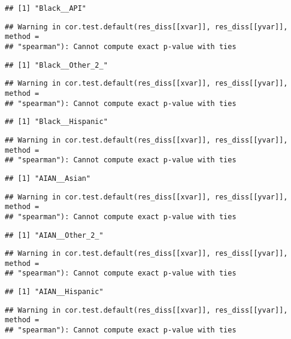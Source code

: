 \documentclass[
]{article}
\begin{document}
\begin{verbatim}
## [1] "Black__API"
\end{verbatim}

\begin{verbatim}
## Warning in cor.test.default(res_diss[[xvar]], res_diss[[yvar]], method =
## "spearman"): Cannot compute exact p-value with ties
\end{verbatim}

\begin{verbatim}
## [1] "Black__Other_2_"
\end{verbatim}

\begin{verbatim}
## Warning in cor.test.default(res_diss[[xvar]], res_diss[[yvar]], method =
## "spearman"): Cannot compute exact p-value with ties
\end{verbatim}

\begin{verbatim}
## [1] "Black__Hispanic"
\end{verbatim}

\begin{verbatim}
## Warning in cor.test.default(res_diss[[xvar]], res_diss[[yvar]], method =
## "spearman"): Cannot compute exact p-value with ties
\end{verbatim}

\begin{verbatim}
## [1] "AIAN__Asian"
\end{verbatim}

\begin{verbatim}
## Warning in cor.test.default(res_diss[[xvar]], res_diss[[yvar]], method =
## "spearman"): Cannot compute exact p-value with ties
\end{verbatim}

\begin{verbatim}
## [1] "AIAN__Other_2_"
\end{verbatim}

\begin{verbatim}
## Warning in cor.test.default(res_diss[[xvar]], res_diss[[yvar]], method =
## "spearman"): Cannot compute exact p-value with ties
\end{verbatim}

\begin{verbatim}
## [1] "AIAN__Hispanic"
\end{verbatim}

\begin{verbatim}
## Warning in cor.test.default(res_diss[[xvar]], res_diss[[yvar]], method =
## "spearman"): Cannot compute exact p-value with ties
\end{verbatim}
\end{document}
